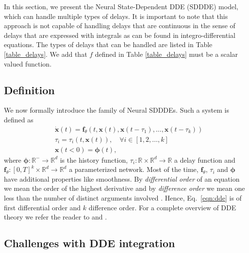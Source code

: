 In this section, we present the Neural State-Dependent DDE (SDDDE) model, which can handle multiple types of delays. It is important to note that this approach is not capable of handling delays that are continuous in the sense of delays that are expressed with integrals as can be found in integro-differential equations. The types of delays that can be handled are listed in Table \ref{table_delays}. We add that $f$ defined in Table \ref{table_delays} must be a scalar valued function.


\subsection{Definition}
We now formally introduce the family of Neural SDDDEs. Such a system is defined as
%
\begin{equation}
\begin{aligned}
 & \dot{\mathbf{x}}(t) = \mathbf{f}_{\theta}(t, \mathbf{x}(t), \mathbf{x}(t-\tau_1), \dots, \mathbf{x}(t-\tau_k)) \\
& \tau_i = \tau_i(t, \mathbf{x}(t)), \quad \forall i \in [1, 2, \ldots,  k] \\
&  \mathbf{x}(t<0) = \mathbf{\phi}(t),
\end{aligned}
\label{eqn:dde}
\end{equation}
%
where $\mathbf{\phi}: \mathbb{R}^- \rightarrow \mathbb{R}^d$ is the history function, $\tau_i: \mathbb{R} \times \mathbb{R}^d \rightarrow \mathbb{R}$ a delay function and $\mathbf{f}_{\theta}:[0, T]^{k} \times \mathbb{R}^d \rightarrow \mathbb{R}^d$ a parameterized network. Most of the time, $\mathbf{f}_{\theta}$, $\tau_i$ and $\mathbf{\phi}$ have additional properties like smoothness. By \textit{differential order} of an equation we mean the order of the highest derivative and by \textit{difference order} we mean one less than the number of distinct arguments involved \citep{Cook_book_ref_dde}. Hence, Eq.~\eqref{eqn:dde} is of first differential order and $k$ difference order. For a complete overview of DDE theory we refer the reader to \citet{numerical_ddebook} and \citet{Cook_book_ref_dde}. 

\subsection{Challenges with DDE integration}
\label{sec:challenges}

